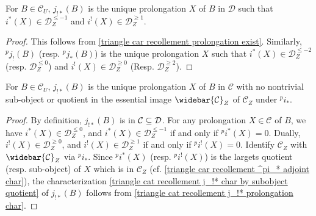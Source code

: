 \begin{corollary}\label{triangle cat recollement j_!* prolongation char}
For $B\in\mathcal{C}_U$, $j_{!*}(B)$ is the unique prolongation $X$ of $B$ in $\mathcal{D}$ such that $i^*(X)\in\mathcal{D}_Z^{\leq -1}$ and $i^!(X)\in\mathcal{D}_Z^{\geq 1}$.
\end{corollary}
\begin{proof}
This follows from \cref{triangle car recollement prolongation exist}. Similarly, ${^pj_!}(B)$ (resp. ${^pj_*}(B)$) is the unique prolongation $X$ such that $i^*(X)\in\mathcal{D}_Z^{\leq -2}$ (resp. $\mathcal{D}_Z^{\leq 0}$) and $i^!(X)\in\mathcal{D}_Z^{\geq 0}$ (Resp. $\mathcal{D}_Z^{\geq 2}$).
\end{proof}

\begin{corollary}\label{triangle cat recollement j_!* char by subobject quotient}
For $B\in\mathcal{C}_U$, $j_{!*}(B)$ is the unique prolongation $X$ of $B$ in $\mathcal{C}$ with no nontrivial sub-object or quotient in the essential image $\widebar{\mathcal{C}}_Z$ of $\mathcal{C}_Z$ under ${^pi}_*$.
\end{corollary}
\begin{proof}
By definition, $j_{!*}(B)$ is in $\mathcal{C}\subseteq\mathcal{D}$. For any prolongation $X\in\mathcal{C}$ of $B$, we have $i^*(X)\in\mathcal{D}_Z^{\leq 0}$, and $i^*(X)\in\mathcal{D}_Z^{\leq -1}$ if and only if ${^pi^*}(X)=0$. Dually, $i^!(X)\in\mathcal{D}_Z^{\geq 0}$, and $i^!(X)\in\mathcal{D}_Z^{\geq 1}$ if and only if ${^pi^!}(X)=0$. Identify $\mathcal{C}_Z$ with $\widebar{\mathcal{C}}_Z$ via ${^pi_*}$. Since ${^pi^*}(X)$ (resp. ${^pi^!}(X)$) is the largets quotient (resp. sub-object) of $X$ which is in $\mathcal{C}_Z$ (cf. \cref{triangle car recollement ^pi_* adjoint char}), the characterization \cref{triangle cat recollement j_!* char by subobject quotient} of $j_{!*}(B)$ follows from \cref{triangle cat recollement j_!* prolongation char}.
\end{proof}

